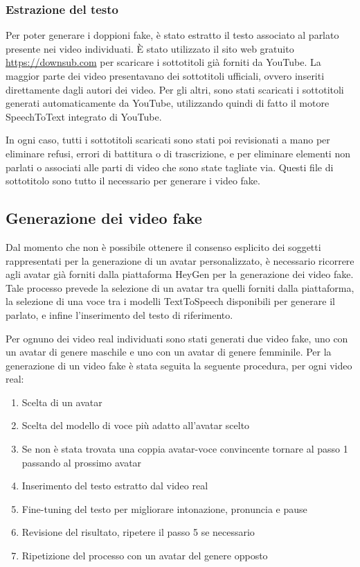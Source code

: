 \subsubsection{Estrazione del testo}
\label{sec:text_extraction}

Per poter generare i doppioni fake, è stato estratto il testo associato al parlato presente nei video individuati. È stato utilizzato il sito web gratuito \url{https://downsub.com} per scaricare i sottotitoli già forniti da YouTube. La maggior parte dei video presentavano dei sottotitoli ufficiali, ovvero inseriti direttamente dagli autori dei video. Per gli altri, sono stati scaricati i sottotitoli generati automaticamente da YouTube, utilizzando quindi di fatto il motore SpeechToText integrato di YouTube.

In ogni caso, tutti i sottotitoli scaricati sono stati poi revisionati a mano per eliminare refusi, errori di battitura o di trascrizione, e per eliminare elementi non parlati o associati alle parti di video che sono state tagliate via. Questi file di sottotitolo sono tutto il necessario per generare i video fake.

\subsection{Generazione dei video fake}

Dal momento che non è possibile ottenere il consenso esplicito dei soggetti rappresentati per la generazione di un avatar personalizzato, è necessario ricorrere agli avatar già forniti dalla piattaforma HeyGen per la generazione dei video fake. Tale processo prevede la selezione di un avatar tra quelli forniti dalla piattaforma, la selezione di una voce tra i modelli TextToSpeech disponibili per generare il parlato, e infine l'inserimento del testo di riferimento.

Per ognuno dei video real individuati sono stati generati due video fake, uno con un avatar di genere maschile e uno con un avatar di genere femminile. Per la generazione di un video fake è stata seguita la seguente procedura, per ogni video real:

\begin{enumerate}
    \item Scelta di un avatar
    \item Scelta del modello di voce più adatto all'avatar scelto
    \item Se non è stata trovata una coppia avatar-voce convincente tornare al passo 1 passando al prossimo avatar
    \item Inserimento del testo estratto dal video real
    \item Fine-tuning del testo per migliorare intonazione, pronuncia e pause
    \item Revisione del risultato, ripetere il passo 5 se necessario
    \item Ripetizione del processo con un avatar del genere opposto
\end{enumerate}

